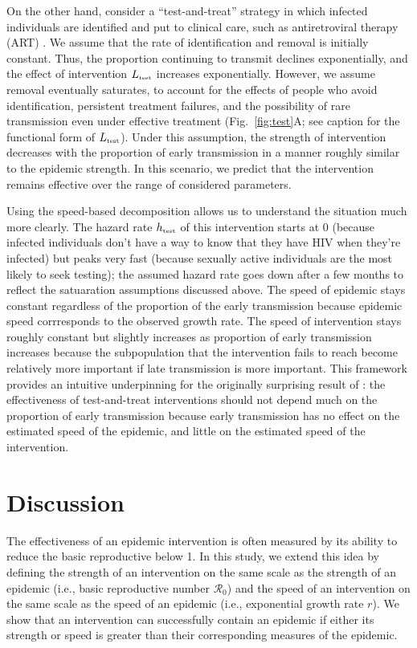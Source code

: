 \documentclass[12pt]{article}
\newcommand{\tsub}[2]{#1_{{\textrm{\tiny #2}}}}
\newcommand{\figref}[1]{Fig.~\ref{fig:#1}}
\begin{document}
On the other hand, consider a ``test-and-treat'' strategy in which infected individuals are identified and put to clinical care, such as antiretroviral therapy (ART) \citep{garnett2009treating, nah2017test}.
We assume that the rate of identification and removal is initially constant.
Thus, the proportion continuing to transmit declines exponentially, and the effect of intervention $\tsub{L}{test}$ increases exponentially.
However, we assume removal eventually saturates, to account for the effects of people who avoid identification, persistent treatment failures, and the possibility of rare transmission even under effective treatment
(\figref{test}A; see caption for the functional form of $\tsub{L}{test}$).
Under this assumption, the strength of intervention decreases with the proportion of early transmission in a manner roughly similar to the epidemic strength.
In this scenario, we predict that the intervention remains effective over the range of considered parameters.

Using the speed-based decomposition allows us to understand the situation much more clearly.
The hazard rate $\tsub{h}{test}$ of this intervention starts at 0 (because infected individuals don't have a way to know that they have HIV when they're infected) but peaks very fast (because sexually active individuals are the most likely to seek testing); 
the assumed hazard rate goes down after a few months to reflect the satuaration assumptions discussed above. 
The speed of epidemic stays constant regardless of the proportion of the early transmission because epidemic speed corrresponds to the observed growth rate.
The speed of intervention stays roughly constant but slightly increases as proportion of early transmission increases because the subpopulation that the intervention fails to reach become relatively more important if late transmission is more important.
This framework provides an intuitive underpinning for the originally surprising result of \cite{eaton2014proportion}: the effectiveness of test-and-treat interventions should not depend much on the proportion of early transmission because early transmission has no effect on the estimated speed of the epidemic, and little on the estimated speed of the intervention.

\section{Discussion}

The effectiveness of an epidemic intervention is often measured by its ability to reduce the basic reproductive below 1.
In this study, we extend this idea by defining the strength of an intervention on the same scale as the strength of an epidemic (i.e., basic reproductive number $\mathcal R_0$) and the speed of an intervention on the same scale as the speed of an epidemic (i.e., exponential growth rate $r$).
We show that an intervention can successfully contain an epidemic if either its strength or speed is greater than their corresponding measures of the epidemic.
\end{document}
